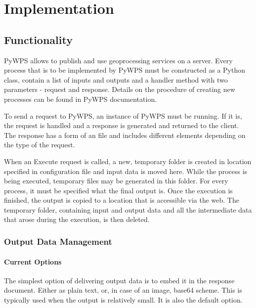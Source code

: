 \chapter{Implementation}
\label{4-practical}

\section{Functionality} 

PyWPS allows to publish and use geoprocessing services on a
server. Every process that is to be implemented by PyWPS must be
constructed as a Python class, contain a list of inputs and outputs
and a handler method with two parameters - request and
response. \cite{pywpsprocess} Details on the procedure of creating new
processes can be found in PyWPS documentation.

To send a request to PyWPS, an instance of PyWPS must be running. If
it is, the request is handled and a response is generated and returned
to the client. The response has a form of an  file and
includes different elements depending on the type of the request.

When an Execute request is called, a new, temporary folder is created
in location specified in configuration file and input data is moved
here. While the process is being executed, temporary files may be
generated in this folder. For every process, it must be specified what
the final output is. Once the execution is finished, the output is
copied to a location that is accessible via the web. The temporary
folder, containing input and output data and all the intermediate data
that arose during the execution, is then deleted.

\subsection{Output Data Management}

\subsubsection{Current Options} 

The simplest option of delivering output data is to embed it in the
 response document. Either as plain text,  or, in case
of an image, base64 scheme. This is typically used when the output is
relatively small. It is also the default option.

